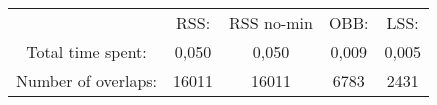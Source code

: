 \begin{tabular}{c|c|c|c|c}\\ 
& RSS: & RSS no-min & OBB: & LSS:\\ 
Total time spent: & 0,050 & 0,050 & 0,009 & 0,005\\ 
Number of overlaps: &16011 & 16011 & 6783 & 2431\\ 
\end{tabular}